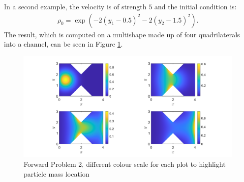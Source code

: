 \documentclass[11pt, a4paper]{article}
\theoremstyle{definition}
\begin{document}
In a second example, the velocity is of strength $5$ and the initial condition is:
 \begin{align*}
	\rho_0 = \exp( -2(y_1 -0.5)^2 - 2 (y_2 - 1.5)^2).
\end{align*}
The result, which is computed on a multishape made up of four quadrilaterals into a channel, can be seen in Figure \ref{F9}.

\begin{figure}[h]
	\centering
	\includegraphics[scale=0.35]{ex2.png}
	\caption{Forward Problem 2, different colour scale for each plot to highlight particle mass location}
	\label{F9}
\end{figure}








\pagebreak	


\end{document}
